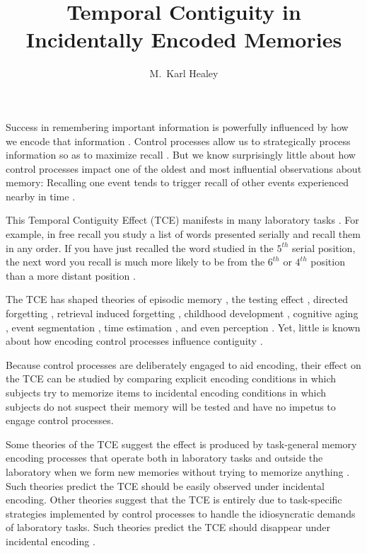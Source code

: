 \documentclass[jou,natbib]{apa6} %
\title{Temporal Contiguity in Incidentally Encoded Memories}
\author{M.\ Karl Healey}
\affiliation{Michigan State University}
\begin{document}
\maketitle
Success in remembering important information is powerfully influenced by how we encode that information \citep{CraiLock72,TulvPear66}. 
Control processes \citep{LehmMalm13,RaaiShif81} allow us to strategically process information so as to maximize recall \citep[e.g.,][]{Unsw16}. But we know surprisingly little about how control processes impact one of the oldest and most influential observations about memory: Recalling one event tends to trigger recall of other events experienced nearby in time \citep{Aris,Bowe72,Kaha96}. 

This Temporal Contiguity Effect (TCE) manifests in many laboratory tasks \citep{DaviEtal08,SchwEtal05}. For example, in free recall you study a list of words presented serially and recall them in any order. If you have just recalled the word studied in the $5^{th}$ serial position, the next word you recall is much more likely to be from the $6^{th}$ or $4^{th}$ position than a more distant position \citep{Kaha96}.

The TCE has shaped theories of episodic memory \citep{LehmMalm13,CortEtal15,LohnEtal14,DaveEtal05,Unsw08}, the testing effect \citep{KarpEtal14}, directed forgetting \citep{SahaEtal13}, retrieval induced forgetting \citep{KlieBaum16}, childhood development \citep{JarroEtal15}, cognitive aging \citep{WahlHuff15,HealKaha15}, event segmentation \citep{EzzyDava14}, time estimation \citep{SahaSmit13}, and even perception \citep{TurkEtal12}. Yet, little is known about how encoding control processes influence contiguity \citep{Hint16}.

Because control processes are deliberately engaged to aid encoding, their effect on the TCE can be studied by comparing explicit encoding conditions in which subjects try to memorize items to incidental encoding conditions in which subjects do not suspect their memory will be tested and have no impetus to engage control processes.


Some theories of the TCE suggest the effect is produced by task-general memory encoding processes that operate both in laboratory tasks and outside the laboratory when we form new memories without trying to memorize anything \citep{HealEtal14,LohnEtal14}. Such theories predict the TCE should be easily observed under incidental encoding. Other theories suggest that the TCE is entirely due to task-specific strategies implemented by control processes to handle the idiosyncratic demands of laboratory tasks. Such theories predict the TCE should disappear under incidental encoding \citep{Hint16}.
\end{document}
